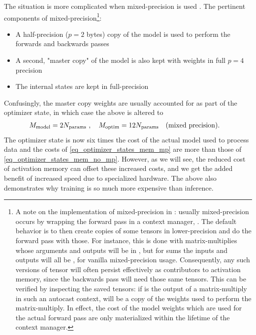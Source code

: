 \documentclass[11pt]{article}
\begin{document}
The situation is more complicated when mixed-precision is used \cite{micikevicius2018mixed}.
The pertinent components of mixed-precision\footnote{A note on the implementation of mixed-precision
in : usually mixed-precision occurs by wrapping the forward pass in a context
manager, . The default behavior is to then create copies of some tensors
in lower-precision and do the forward pass with those. For instance, this is done with
matrix-multiplies whose arguments and outputs will be in , but for sums
the inputs and outputs will all be , for vanilla mixed-precision usage.
Consequently, any such  versions of tensor will often persist effectively
as contributors to activation memory, since the backwards pass will need those same tensors. This
can be verified by inspecting the saved tensors: if  is the output of a
matrix-multiply in such an autocast context,  will be a
 copy of the weights used to perform the matrix-multiply. In effect, the
cost of the model weights which are used for the actual forward pass are only materialized within
the lifetime of the context manager.}:
\begin{itemize}
	\item A half-precision ($ p=2 $ bytes) copy of the model is used to perform the forwards and
	      backwards passes
	\item A second, "master copy" of the model is also kept with weights in full $ p=4 $ precision
	\item The internal  states are kept in full-precision
\end{itemize}
Confusingly, the master copy weights are usually accounted for as part of the optimizer state, in
which case the above is altered to
\begin{align}
	M _{ \rm model} & = 2 N _{ \rm params } \ , \quad M_{ \rm  optim } = 12 N _{ \rm params }
	\quad ({\rm mixed \ precision}) .
	\label{eq_optimizer_states_mem_mp}
\end{align}
The optimizer state is now six times the cost of the actual model used to process data and the costs
of \eqref{eq_optimizer_states_mem_mp} are more than those of \eqref{eq_optimizer_states_mem_no_mp}.
However, as we will see, the reduced cost of activation memory can offset these increased costs, and
we get the added benefit of increased speed due to specialized hardware. The above also demonstrates
why training is so much more expensive than inference.
\end{document}
